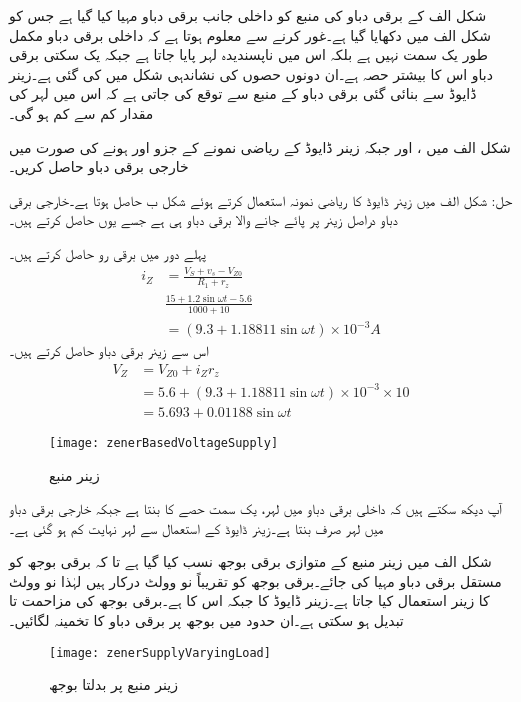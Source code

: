 

شکل  الف  کے برقی دباو کی منبع کو داخلی جانب برقی دباو مہیا کیا گیا ہے جس کو شکل  الف میں دکھایا گیا ہے۔غور کرنے سے معلوم ہوتا ہے کہ داخلی برقی دباو مکمل طور یک سمت نہیں ہے بلکہ اس میں ناپسندیدہ لہر  پایا جاتا ہے جبکہ یک سکتی برقی دباو   اس کا بیشتر حصہ ہے۔ان دونوں حصوں کی نشاندہی شکل میں کی گئی ہے۔زینر ڈایوڈ سے بنائی گئی برقی دباو کے منبع سے توقع کی جاتی ہے کہ اس میں لہر کی مقدار کم سے کم ہو گی۔

شکل  الف میں ،  اور  جبکہ زینر ڈایوڈ کے ریاضی نمونے کے جزو  اور  ہونے کی صورت میں خارجی برقی دباو  حاصل کریں۔

حل:	شکل  الف میں زینر ڈایوڈ کا ریاضی نمونہ استعمال کرتے ہوئے شکل  ب حاصل ہوتا ہے۔خارجی برقی دباو دراصل زینر پر پائے جانے والا برقی دباو  ہی ہے جسے یوں حاصل کرتے ہیں۔

پہلے دور میں برقی رو حاصل کرتے ہیں۔
\begin{align*}
i_Z&=\frac{V_S+v_s-V_{Z0}}{R_1+r_z}\\
&\frac{15+1.2 \sin \omega t -5.6}{1000+10}\\
&=\left (9.3+1.18811 \sin \omega t \right ) \times 10^{-3} A
\end{align*}
اس سے زینر برقی دباو حاصل کرتے ہیں۔
\begin{align*}
V_Z&=V_{Z0}+i_Z r_z\\
&=5.6+\left (9.3+1.18811 \sin \omega t \right ) \times 10^{-3} \times 10\\
&=5.693+0.01188 \sin \omega t
\end{align*}
%
\begin{figure}
\centering
\texttt{[image: zenerBasedVoltageSupply]}
\caption{زینر منبع}
\label{شکل_زینر_منبع}
\end{figure}
آپ دیکھ سکتے ہیں کہ داخلی برقی دباو میں لہر، یک سمت حصے کا    بنتا ہے جبکہ خارجی برقی دباو میں لہر صرف   بنتا ہے۔زینر ڈایوڈ کے استعمال سے لہر نہایت کم ہو گئی ہے۔

شکل  الف میں زینر منبع کے متوازی برقی بوجھ  نسب کیا گیا ہے تا کہ برقی بوجھ کو مستقل برقی دباو مہیا کی جائے۔برقی بوجھ کو تقریباً نو وولٹ درکار ہیں لہٰذا نو وولٹ کا زینر استعمال کیا جاتا ہے۔زینر ڈایوڈ کا  جبکہ اس کا  ہے۔برقی بوجھ کی مزاحمت  تا  تبدیل ہو سکتی ہے۔ان حدود میں بوجھ پر برقی دباو  کا تخمینہ لگائیں۔
\begin{figure}
\centering
\texttt{[image: zenerSupplyVaryingLoad]}
\caption{زینر منبع پر بدلتا بوجھ}
\label{شکل_زینر_منبع_بدلتا_بار}
\end{figure}

